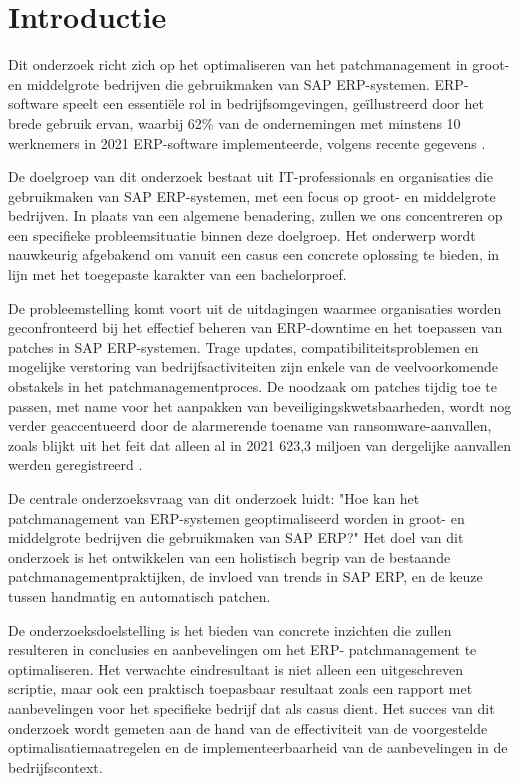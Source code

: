 
\section{Introductie}%
\label{sec:introductie}
Dit onderzoek richt zich op het optimaliseren van het patchmanagement in groot- en middelgrote bedrijven die gebruikmaken van SAP ERP-systemen. ERP-software speelt een essentiële rol in bedrijfsomgevingen, geïllustreerd door het brede gebruik ervan, waarbij 62\% van de ondernemingen met minstens 10 werknemers in 2021 ERP-software implementeerde, volgens recente gegevens \autocite{StatistiekVlaanderen2022}.

De doelgroep van dit onderzoek bestaat uit IT-professionals en organisaties die gebruikmaken van SAP ERP-systemen, met een focus op groot- en middelgrote bedrijven. In plaats van een algemene benadering, zullen we ons concentreren op een specifieke probleemsituatie binnen deze doelgroep. Het onderwerp wordt nauwkeurig afgebakend om vanuit een casus een concrete oplossing te bieden, in lijn met het toegepaste karakter van een bachelorproef.

De probleemstelling komt voort uit de uitdagingen waarmee organisaties worden geconfronteerd bij het effectief beheren van ERP-downtime en het toepassen van patches in SAP ERP-systemen. Trage updates, compatibiliteitsproblemen en mogelijke verstoring van bedrijfsactiviteiten zijn enkele van de veelvoorkomende obstakels in het patchmanagementproces. De noodzaak om patches tijdig toe te passen, met name voor het aanpakken van beveiligingskwetsbaarheden, wordt nog verder geaccentueerd door de alarmerende toename van ransomware-aanvallen, zoals blijkt uit het feit dat alleen al in 2021 623,3 miljoen van dergelijke aanvallen werden geregistreerd \autocite{Griffiths2022}.

De centrale onderzoeksvraag van dit onderzoek luidt: "Hoe kan het patchmanagement van ERP-systemen geoptimaliseerd worden in groot- en middelgrote bedrijven die gebruikmaken van SAP ERP?" Het doel van dit onderzoek is het ontwikkelen van een holistisch begrip van de bestaande patchmanagementpraktijken, de invloed van trends in SAP ERP, en de keuze tussen handmatig en automatisch patchen. 

De onderzoeksdoelstelling is het bieden van concrete inzichten die zullen resulteren in conclusies en aanbevelingen om het ERP- patchmanagement te optimaliseren. Het verwachte eindresultaat is niet alleen een uitgeschreven scriptie, maar ook een praktisch toepasbaar resultaat zoals een rapport met aanbevelingen voor het specifieke bedrijf dat als casus dient. Het succes van dit onderzoek wordt gemeten aan de hand van de effectiviteit van de voorgestelde optimalisatiemaatregelen en de implementeerbaarheid van de aanbevelingen in de bedrijfscontext.

